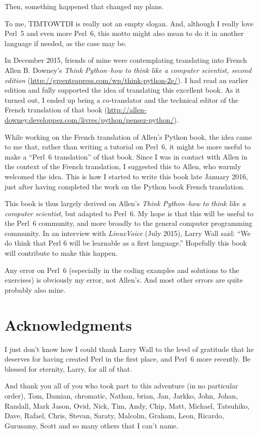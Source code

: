 Then, something happened that changed my plans.

To me, TIMTOWTDI is really not an empty slogan. And, although 
I really love Perl~5 and even more Perl~6, this motto might 
also mean to do it in another language if needed, as the 
case may be.

In December 2015, friends of mine were contemplating translating 
into French Allen B. Downey's \emph{Think Python--how to think 
like a computer scientist, second edition} 
(\url{http://greenteapress.com/wp/think-python-2e/}). I had 
read an earlier edition and fully supported 
the idea of translating this excellent book. As it turned out, 
I ended up being a co-translator and the technical editor of 
the French translation of that book (\url{http://allen-downey.developpez.com/livres/python/pensez-python/}).

While working on the French translation of Allen's Python book, 
the idea came to me that, rather than writing a tutorial on 
Perl~6, it might be more useful to make a ``Perl~6 translation'' 
of that book. Since I was in contact with Allen in the context 
of the French translation, I suggested this to Allen, who 
warmly welcomed the idea. This is how I started to write this 
book late January 2016, just after having completed the 
work on the Python book French translation.

This book is thus largely derived on Allen's \emph{Think Python--how 
to think like a computer scientist}, but adapted to Perl~6. My 
hope is that this will be useful to the Perl~6 community, and 
more broadly to the general computer programming community. In 
an interview with \emph{LinuxVoice} (July 2015), Larry Wall said: 
``We do think that Perl 6 will be learnable as a first language.''
Hopefully this book will contribute to make this happen. 

Any error on Perl~6 (especially in the coding examples and 
solutions to the exercises) is obviously my error, not 
Allen's. And most other errors are quite probably also mine.

\section*{Acknowledgments}

I just don't know how I could thank Larry Wall to the level of 
gratitude that he deserves for having created Perl in the first 
place, and Perl~6 more recently. Be blessed for eternity, Larry, 
for all of that. 

And thank you all of you who took part to this 
adventure (in no particular order), Tom, Damian, 
chromatic, Nathan, brian, Jan, Jarkko, John, Johan, Randall, 
Mark Jason, Ovid, Nick, Tim, Andy, Chip, Matt, Michael, Tatsuhiko, 
Dave, Rafael, Chris, Stevan, Saraty, Malcolm, Graham, Leon, 
Ricardo, Gurusamy, Scott and so many others that I can't name.  

